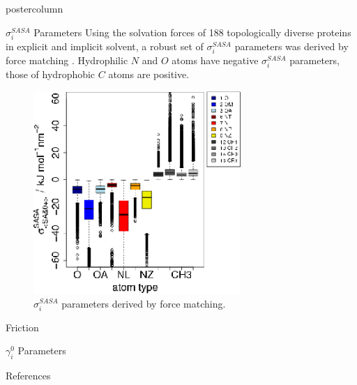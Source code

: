 \documentclass{beamer}
\newcommand{\sig}{$\sigma_i^{SASA}$}
\newcommand{\gam}{$\gamma_i^0$}
\begin{document}
\begin{frame}
\begin{columns}
\begin{column}{.45\textwidth}
\begin{beamercolorbox}[center]{postercolumn}
\begin{minipage}{.98\textwidth}
{\begin{myblock}{\sig{} Parameters}
Using the solvation forces of 188 topologically diverse proteins in explicit
and implicit solvent, a robust set of \sig{} parameters was derived by
force matching \cite{Kleinjung_2012a}. Hydrophilic $N$ and $O$ atoms have
negative \sig{} parameters, those of hydrophobic $C$ atoms are positive.
\vspace{2cm}
\begin{figure}
\begin{minipage}{1.0\textwidth}
	\centering\includegraphics[width=0.7\textwidth]{./sigma.all.atomtype.box.sided.eps}
	\caption{\sig{} parameters derived by force matching.}
\label{fig:projection}
\end{minipage}
\end{figure}
\end{myblock}\vfill
\begin{myblock}{Friction}

\end{myblock}\vfill
\begin{myblock}{\gam{} Parameters}

\end{myblock}\vfill
\begin{myblock}{References}
\footnotesize


\end{myblock}\vfill
}\end{minipage}
\end{beamercolorbox}
\end{column}
\end{columns}
\end{frame}
\end{document}
